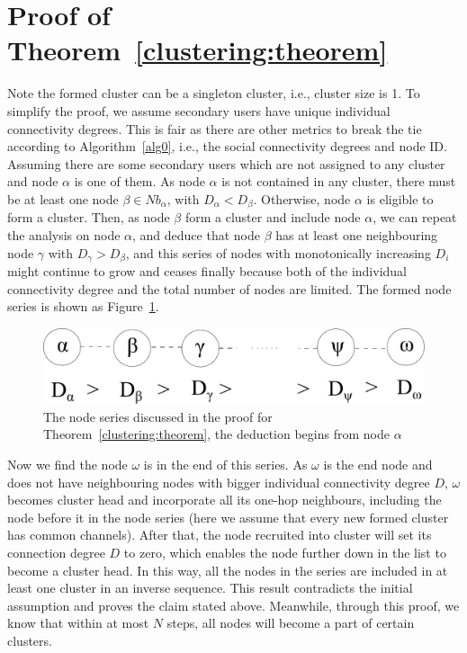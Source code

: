 \documentclass[10pt,journal,compsoc]{IEEEtran}
\makeatletter
\theoremstyle{mytheoremstyle}
\theoremstyle{mytheoremstyle}
\theoremstyle{mytheoremstyle}
\renewenvironment{proof}[1][\proofname]{%
      \par\pushQED{\qed}\fontfamily{ptm}\selectfont%
      \topsep6\p@\@plus6\p@\relax
      \trivlist\item[\hskip\labelsep\bfseries#1\@addpunct{.}]%
      \ignorespaces
    }{%
      \popQED\endtrivlist\@endpefalse
    }
\newcommand{\ie}{i.e., }
\makeatother
\begin{document}
\section*{Proof of Theorem~\ref{clustering:theorem}}
\label{proof_clustering:theorem}
\begin{proof}
Note the formed cluster can be a singleton cluster, \ie cluster size is 1.
To simplify the proof, we assume secondary users have unique individual connectivity degrees.
This is fair as there are other metrics to break the tie according to Algorithm~\ref{alg0}, \ie the social connectivity degrees and node ID.
Assuming there are some secondary users which are not assigned to any cluster and node $\alpha$ is one of them.
As node $\alpha$ is not contained in any cluster, there must be at least one node $\beta\in Nb_\alpha$, with $D_{\alpha} < D_{\beta}$.
Otherwise, node $\alpha$ is eligible to form a cluster.
Then, as node $\beta$ form a cluster and include node $\alpha$, we can repeat the analysis on node $\alpha$, and deduce that node $\beta$ has at least one neighbouring node $\gamma$ with $D_{\gamma}>D_{\beta}$, and this series of nodes with monotonically increasing $D_i$ might continue to grow and ceases finally because both of the individual connectivity degree 
and the total number of nodes are limited.
The formed node series is shown as Figure~\ref{lemma1}.

\begin{figure}[ht!]
  \centering
\includegraphics[width=0.6\linewidth]{lemma1.pdf}
	\caption{The node series discussed in the proof for Theorem~\ref{clustering:theorem}, the deduction begins from node $\alpha$}
	\label{lemma1}
\end{figure}


Now we find the node $\omega$ is in the end of this series.
As $\omega$ is the end node and does not have neighbouring nodes with bigger individual connectivity degree $D$, $\omega$ becomes cluster head and incorporate all its one-hop neighbours, including the node before it in the node series (here we assume that every new formed cluster has common channels).
After that, the node recruited into cluster will set its connection degree $D$ to zero, which enables the node further down in the list to become a cluster head.
In this way, all the nodes in the series are included in at least one cluster in an inverse sequence.
This result contradicts the initial assumption and proves the claim stated above.
Meanwhile, through this proof, we know that within at most $N$ steps, all nodes will become a part of certain clusters.
\end{proof}
\end{document}
